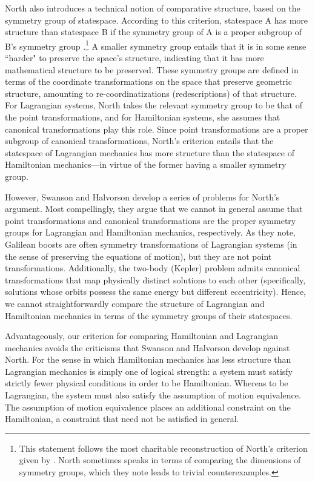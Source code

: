 \documentclass[letterpaper]{article}
\begin{document}
North also introduces a technical notion of comparative structure, based on the symmetry group of statespace. According to this criterion, statespace A has more structure than statespace B if the symmetry group of A is a proper subgroup of B's symmetry group \parencites[87-88]{North}.\footnote{This statement follows the most charitable reconstruction of North's criterion given by \textcites[]{Swanson}. North sometimes speaks in terms of comparing the dimensions of symmetry groups, which they note leads to trivial counterexamples.} A smaller symmetry group entails that it is in some sense ``harder" to preserve the space's structure, indicating that it has more mathematical structure to be preserved. These symmetry groups are defined in terms of the coordinate transformations on the space that preserve geometric structure, amounting to re-coordinatizations (redescriptions) of that structure. For Lagrangian systems, North takes the relevant symmetry group to be that of the point transformations, and for Hamiltonian systems, she assumes that canonical transformations play this role. Since point transformations are a proper subgroup of canonical transformations, North's criterion entails that the statespace of Lagrangian mechanics has more structure than the statespace of Hamiltonian mechanics---in virtue of the former having a smaller symmetry group. 

However, Swanson and Halvorson \parencites*[]{Swanson} develop a series of problems for North's argument. Most compellingly, they argue that we cannot in general assume that point transformations and canonical transformations are the proper symmetry groups for Lagrangian and Hamiltonian mechanics, respectively. As they note, Galilean boosts are often symmetry transformations of Lagrangian systems (in the sense of preserving the equations of motion), but they are not point transformations. Additionally, the two-body (Kepler) problem admits canonical transformations that map physically distinct solutions to each other (specifically, solutions whose orbits possess the same energy but different eccentricity). Hence, we cannot straightforwardly compare the structure of Lagrangian and Hamiltonian mechanics in terms of the symmetry groups of their statespaces. 

Advantageously, our criterion for comparing Hamiltonian and Lagrangian mechanics avoids the criticisms that Swanson and Halvorson develop against North. For the sense in which Hamiltonian mechanics has less structure than Lagrangian mechanics is simply one of logical strength: a system must satisfy strictly fewer physical conditions in order to be Hamiltonian. Whereas to be Lagrangian, the system must also satisfy the assumption of motion equivalence. The assumption of motion equivalence places an additional constraint on the Hamiltonian, a constraint that need not be satisfied in general. 
\end{document}
